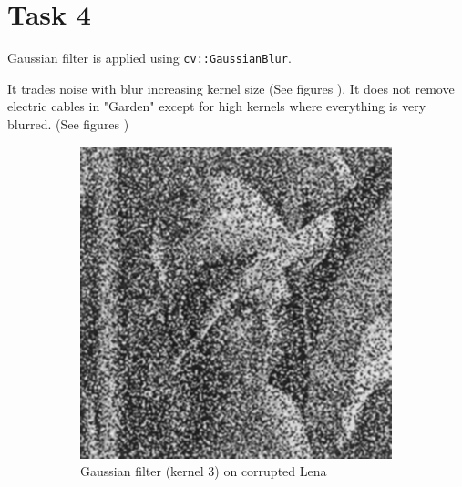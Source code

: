 \documentclass{article}
\begin{document}
\section*{Task 4}
Gaussian filter is applied using \texttt{cv::GaussianBlur}.

It trades noise with blur increasing kernel size (See figures ).
It does not remove electric cables in "Garden" except for high kernels where everything is very blurred. (See figures )
\begin{figure}[H]
	\centering
	\begin{subfigure}{0.3\textwidth}
		\includegraphics[width=\textwidth]{Generated/Lena_corrupted_gaussian3filter.png}
		\caption{Gaussian filter (kernel 3) on corrupted Lena}
		\label{fig:gaussian3_Lena}
	\end{subfigure}
	\hfill
	\begin{subfigure}{0.3\textwidth}

\end{subfigure}
\end{figure}
\end{document}
